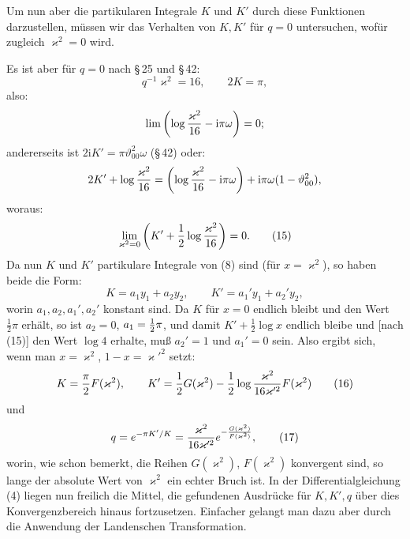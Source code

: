 \documentclass[11pt]{article}
\providecommand{\tht}{\vartheta}
\providecommand{\ii}{\mathrm{i}}
\begin{document}
Um nun aber die partikularen Integrale $K$ und $K'$ durch diese Funktionen darzustellen, müssen wir das Verhalten von $K,K'$ für $q=0$ untersuchen, wofür zugleich $\varkappa^2=0$ wird.

Es ist aber für $q=0$ nach \S\,25 und \S\,42:
\[
q^{-1}\varkappa^2=16,
\qquad
2K=\pi,
\]
also:
\[
\lim\left(\log{\varkappa^2\over16}-\ii\pi\omega\right)=0;
\]
andererseits ist $2\ii K'=\pi\tht_{00}^2\omega$ (\S\,42) oder:
\[
2K'+\log{\varkappa^2\over16}=\left(\log{\varkappa^2\over16}-\ii\pi\omega\right)+\ii\pi\omega(1-\tht_{00}^2),
\]
woraus:
\begin{equation}
\lim_{\varkappa^2=0}\left(K'+{1\over2}\log{\varkappa^2\over16}\right)=0.
\tag{15}
\end{equation}
Da nun $K$ und $K'$ partikulare Integrale von (8) sind (für $x=\varkappa^2$), so haben beide die Form:
\[
K=a_1y_1+a_2y_2,
\qquad
K'=a_1'y_1+a_2'y_2,
\]
worin $a_1,a_2,a_1',a_2'$ konstant sind. Da $K$ für $x=0$ endlich bleibt und den Wert $\frac12\pi$ erhält, so ist $a_2=0$, $a_1={1\over2}\pi$, und damit $K'+\frac12\log x$ endlich bleibe und [nach (15)] den Wert $\log4$ erhalte, muß $a_2'=1$ und $a_1'=0$ sein. Also ergibt sich, wenn man $x=\varkappa^2$, $1-x=\varkappa'^2$ setzt:
\begin{equation}
K={\pi\over2}F(\varkappa^2),
\qquad
K'={1\over2}G(\varkappa^2)-{1\over2}\log{\varkappa^2\over16\varkappa'^2}F(\varkappa^2)
\tag{16}
\end{equation}
und
\begin{equation}
q=e^{-\pi K'/K}={\varkappa^2\over16\varkappa'^2}
 e^{-{G(\varkappa^2)\over F(\varkappa^2)}},
\tag{17}
\end{equation}
worin, wie schon bemerkt, die Reihen $G(\varkappa^2)$, $F(\varkappa^2)$ konvergent sind, so lange der absolute Wert von $\varkappa^2$ ein echter Bruch ist. In der Differentialgleichung (4) liegen nun freilich die Mittel, die gefundenen Ausdrücke für $K,K',q$ über dies Konvergenzbereich hinaus fortzusetzen. Einfacher gelangt man dazu aber durch die Anwendung der Landenschen Transformation.
\end{document}
